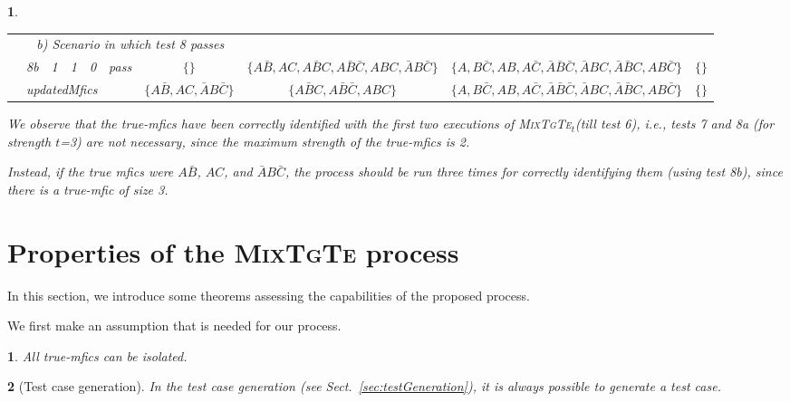 \documentclass[
12pt, %
oneside, %
english, %
singlespacing, %
headsepline, %
consistentlayout, %
]{MastersDoctoralThesis} %
\newcommand{\mix}{\textsc{MixTgTe}\xspace}
\newcommand{\mixt}{\textsc{MixTgTe$_t$}\xspace}
\newcommand{\truemfic}{true-\textsf{mfic}\xspace}
\newcommand{\truemfics}{true-\textsf{mfics}\xspace}
\newcommand{\mfics}{\textsf{mfics}\xspace}
\newcommand{\ets}{\ensuremath{\mathit{ETS}}\xspace}
\newtheorem{thm}{\protect\theoremname}
\newtheorem{example}[thm]{\protect\examplename}
\providecommand{\examplename}{Example}
\providecommand{\theoremname}{Theorem}
\theoremstyle{plain}
\theoremstyle{definition}
\theoremstyle{remark}
\theoremstyle{plain}
\newtheorem{assumption}{\protect\assumptionname}
\theoremstyle{plain}
\providecommand{\examplename}{Example}
\providecommand{\theoremname}{Theorem}
\providecommand{\assumptionname}{Assumption}
\theoremstyle{remark}
\begin{document}
\begin{example}
\begin{table}[!tb]
{\begin{tabular}{c|lc|c|c||c|c|c|c|c}
				\cline{2-10}
				& \multicolumn{6}{c}{b) Scenario in which test 8 passes} \\
				& 8b & 1 & 1 & 0 & pass & $\{\}$ & $\{A\bar{B}, AC, A\bar{B}C, A\bar{B}\bar{C}, ABC, \bar{A}B\bar{C}\}$ & $\{A, B\bar{C}, AB, A\bar{C}, \bar{A}\bar{B}\bar{C}, \bar{A}BC, \bar{A}\bar{B}C, AB\bar{C}\}$ & $\{\}$\\
				& \multicolumn{5}{l}{updatedMfics} & $\{A\bar{B}, AC, \bar{A}B\bar{C}\}$ & $\{A\bar{B}C, A\bar{B}\bar{C}, ABC \}$ & $\{A, B\bar{C}, AB, A\bar{C}, \bar{A}\bar{B}\bar{C}, \bar{A}BC, \bar{A}\bar{B}C, AB\bar{C}\}$ & $\{\}$\\
				\bottomrule
			\end{tabular}
		}
	\end{table}
	We observe that the \truemfics have been correctly identified with the first two executions of \mixt (till test 6), i.e., tests 7 and 8a (for strength $t$=3) are not necessary, since the maximum strength of the \truemfics is 2.
	
	Instead, if the true \mfics were $A\bar{B}$, $AC$, and $\bar{A}B\bar{C}$, the process should be run three times for correctly identifying them (using test 8b), since there is a \truemfic of size 3.
\end{example}


\section{Properties of the \mix process}\label{sec:theorems}

In this section, we introduce some theorems assessing the capabilities of the proposed process.

We first make an assumption that is needed for our process.



\begin{assumption}\label{assu:oneTestEts}
	All \truemfics can be isolated.
\end{assumption}

\begin{thm}[Test case generation]\label{thm:testGen}
	In the test case generation (see Sect.~\ref{sec:testGeneration}), it is always possible to generate a test case.
\end{thm}
\end{document}
